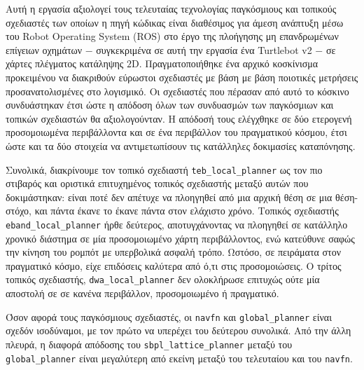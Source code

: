 Αυτή η εργασία αξιολογεί τους τελευταίας τεχνολογίας παγκόσμιους και τοπικούς σχεδιαστές των οποίων η πηγή
κώδικας είναι διαθέσιμος για άμεση ανάπτυξη μέσω του Robot Operating System (ROS)
στο έργο της πλοήγησης μη επανδρωμένων επίγειων οχημάτων $-$ συγκεκριμένα σε
αυτή την εργασία ένα Turtlebot v2 $-$ σε χάρτες πλέγματος κατάληψης $2$D.
Πραγματοποιήθηκε ένα αρχικό κοσκίνισμα προκειμένου να διακριθούν εύρωστοι σχεδιαστές με βάση
με βάση ποιοτικές μετρήσεις προσανατολισμένες στο λογισμικό. Οι σχεδιαστές που πέρασαν από
αυτό το κόσκινο συνδυάστηκαν έτσι ώστε η απόδοση όλων των συνδυασμών των
παγκόσμιων και τοπικών σχεδιαστών θα αξιολογούνταν. Η απόδοσή τους ελέγχθηκε
σε δύο ετερογενή προσομοιωμένα περιβάλλοντα και σε ένα περιβάλλον του πραγματικού κόσμου,
έτσι ώστε και τα δύο στοιχεία να αντιμετωπίσουν τις κατάλληλες δοκιμασίες καταπόνησης.

Συνολικά, διακρίνουμε τον τοπικό σχεδιαστή \texttt{teb\_local\_planner} ως τον πιο
στιβαρός και οριστικά επιτυχημένος τοπικός σχεδιαστής μεταξύ αυτών που δοκιμάστηκαν: είναι
ποτέ δεν απέτυχε να πλοηγηθεί από μια αρχική θέση σε μια θέση-στόχο, και πάντα έκανε
το έκανε πάντα στον ελάχιστο χρόνο. Τοπικός σχεδιαστής \texttt{eband\_local\_planner}
ήρθε δεύτερος, αποτυγχάνοντας να πλοηγηθεί σε κατάλληλο χρονικό διάστημα σε μία
προσομοιωμένο χάρτη περιβάλλοντος, ενώ κατεύθυνε σαφώς την κίνηση του ρομπότ
με υπερβολικά ασφαλή τρόπο. Ωστόσο, σε πειράματα στον πραγματικό κόσμο, είχε επιδόσεις
καλύτερα από ό,τι στις προσομοιώσεις. Ο τρίτος τοπικός σχεδιαστής,
\texttt{dwa\_local\_planner} δεν ολοκλήρωσε επιτυχώς ούτε μία αποστολή σε
σε κανένα περιβάλλον, προσομοιωμένο ή πραγματικό.

Όσον αφορά τους παγκόσμιους σχεδιαστές, οι \texttt{navfn} και \texttt{global\_planner}
είναι σχεδόν ισοδύναμοι, με τον πρώτο να υπερέχει του δεύτερου συνολικά.
Από την άλλη πλευρά, η διαφορά απόδοσης του \texttt{sbpl\_lattice\_planner}
μεταξύ του \texttt{global\_planner} είναι μεγαλύτερη από εκείνη μεταξύ του τελευταίου
και του \texttt{navfn}.

